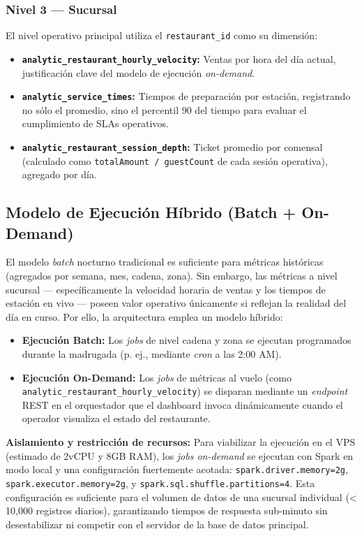 \subsubsection{Nivel 3 --- Sucursal}
El nivel operativo principal utiliza el \texttt{restaurant\_id} como su dimensión:

\begin{itemize}[leftmargin=1.5em]
  \item \textbf{\texttt{analytic\_restaurant\_hourly\_velocity}:} Ventas por hora del día actual, justificación clave del modelo de ejecución \textit{on-demand}.
  \item \textbf{\texttt{analytic\_service\_times}:} Tiempos de preparación por estación, registrando no sólo el promedio, sino el percentil 90 del tiempo para evaluar el cumplimiento de SLAs operativos.
  \item \textbf{\texttt{analytic\_restaurant\_session\_depth}:} Ticket promedio por comensal (calculado como \texttt{totalAmount / guestCount} de cada sesión operativa), agregado por día.
\end{itemize}

\subsection{Modelo de Ejecución Híbrido (Batch + On-Demand)}

El modelo \textit{batch} nocturno tradicional es suficiente para métricas históricas (agregados por semana, mes, cadena, zona). Sin embargo, las métricas a nivel sucursal --- específicamente la velocidad horaria de ventas y los tiempos de estación en vivo --- poseen valor operativo únicamente si reflejan la realidad del día en curso. Por ello, la arquitectura emplea un modelo híbrido:

\begin{itemize}[leftmargin=1.5em]
  \item \textbf{Ejecución Batch:} Los \textit{jobs} de nivel cadena y zona se ejecutan programados durante la madrugada (p. ej., mediante \textit{cron} a las 2:00 AM).
  \item \textbf{Ejecución On-Demand:} Los \textit{jobs} de métricas al vuelo (como \texttt{analytic\_restaurant\_hourly\_velocity}) se disparan mediante un \textit{endpoint} REST en el orquestador que el dashboard invoca dinámicamente cuando el operador visualiza el estado del restaurante.
\end{itemize}

\textbf{Aislamiento y restricción de recursos:} Para viabilizar la ejecución en el VPS (estimado de 2vCPU y 8GB RAM), los \textit{jobs on-demand} se ejecutan con Spark en modo local y una configuración fuertemente acotada: \texttt{spark.driver.memory=2g}, \texttt{spark.executor.memory=2g}, y \texttt{spark.sql.shuffle.partitions=4}. Esta configuración es suficiente para el volumen de datos de una sucursal individual (< 10,000 registros diarios), garantizando tiempos de respuesta sub-minuto sin desestabilizar ni competir con el servidor de la base de datos principal.

